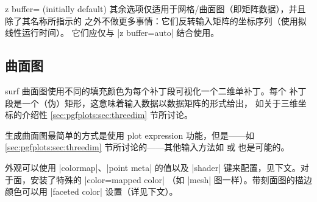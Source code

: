 {\begin{pgfplotskey}{z buffer= (initially default)%
}
    其余选项仅适用于网格/曲面图（即矩阵数据），并且除了其名称所指示的
    之外不做更多事情：它们反转输入矩阵的坐标序列（使用拟线性运行时间）。
    它们应仅与 |z buffer=auto| 结合使用。
\end{pgfplotskey}


\subsection{曲面图}
\label{sec:pgfplots:surfplots}

\begin{plottype}[/pgfplots]{surf}
    曲面图使用不同的填充颜色为每个补丁段可视化一个二维单补丁。每个
    补丁段是一个（伪）矩形，这意味着输入数据以数据矩阵的形式给出，
    如关于三维坐标的介绍性 \ref{sec:pgfplots:sec:threedim} 节所讨论。

\pgfplotsexpensiveexample
\begin{codeexample}[]
\end{codeexample}

    生成曲面图最简单的方式是使用 plot expression 功能，但是——如
    \ref{sec:pgfplots:sec:threedim} 节所讨论的——其他输入方法如
     或
     也是可能的。

    外观可以使用 |colormap|、|point meta| 的值以及
    |shader| 键来配置，见下文。对于面，安装了特殊的 |color=mapped color|
    （如 |mesh| 图一样）。带刻面图的描边颜色可以用 |faceted color|
    设置（详见下文）。

\pgfplotsexpensiveexample
\begin{codeexample}[]
\end{codeexample}

\pgfplotsexpensiveexample
\begin{codeexample}[]
\end{codeexample}


\end{plottype}}
